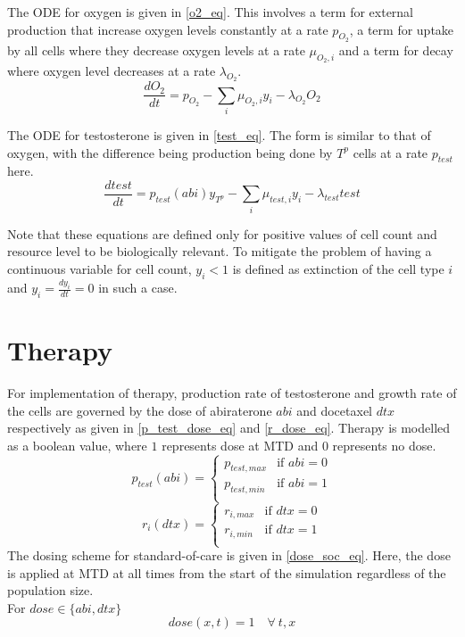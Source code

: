 The ODE for oxygen is given in \autoref{o2_eq}. This involves a term for external production that increase oxygen levels constantly at a rate $p_{O_2}$, a term for uptake by all cells where they decrease oxygen levels at a rate $\mu_{O_2,i}$ and a term for decay where oxygen level decreases at a rate $\lambda_{O_2}$.
\begin{equation}
  \frac{dO_2}{dt} = p_{O_2} - \sum_i \mu_{O_2,i} y_i - \lambda_{O_2} O_2
  \label{o2_eq}
\end{equation}

The ODE for testosterone is given in \autoref{test_eq}. The form is similar to that of oxygen, with the difference being production being done by $T^p$ cells at a rate $p_{test}$ here.
\begin{equation}
  \frac{dtest}{dt} = p_{test}(abi) y_{T^p} - \sum_i \mu_{test,i} y_i - \lambda_{test} test
  \label{test_eq}
\end{equation}

Note that these equations are defined only for positive values of cell count and resource level to be biologically relevant. To mitigate the problem of having a continuous variable for  cell count, $y_i < 1$ is defined as extinction of the cell type $i$ and $y_i = \frac{dy_i}{dt} = 0$ in such a case.

\section{Therapy}
For implementation of therapy, production rate of testosterone and growth rate of the cells are governed by the dose of abiraterone $abi$ and docetaxel $dtx$ respectively as given in \autoref{p_test_dose_eq} and \autoref{r_dose_eq}. Therapy is modelled as a boolean value, where $1$ represents dose at MTD and $0$ represents no dose.
\begin{equation}
  p_{test}(abi) = \begin{cases}
  p_{test,max} &\text{if } abi = 0 \\
  p_{test,min} &\text{if } abi = 1 \\
  \end{cases}
  \label{p_test_dose_eq}
\end{equation}
\begin{equation}
  r_i(dtx) = \begin{cases}
  r_{i,max} &\text{if } dtx = 0 \\
  r_{i,min} &\text{if } dtx = 1 \\
  \end{cases}
  \label{r_dose_eq}
\end{equation}
The dosing scheme for standard-of-care is given in \autoref{dose_soc_eq}. Here, the dose is applied at MTD at all times from the start of the simulation regardless of the population size.\\
For $dose \in \{abi,dtx\}$
\begin{equation}
  dose(x,t) = 1 \quad \forall\ t, x
  \label{dose_soc_eq}
\end{equation}

